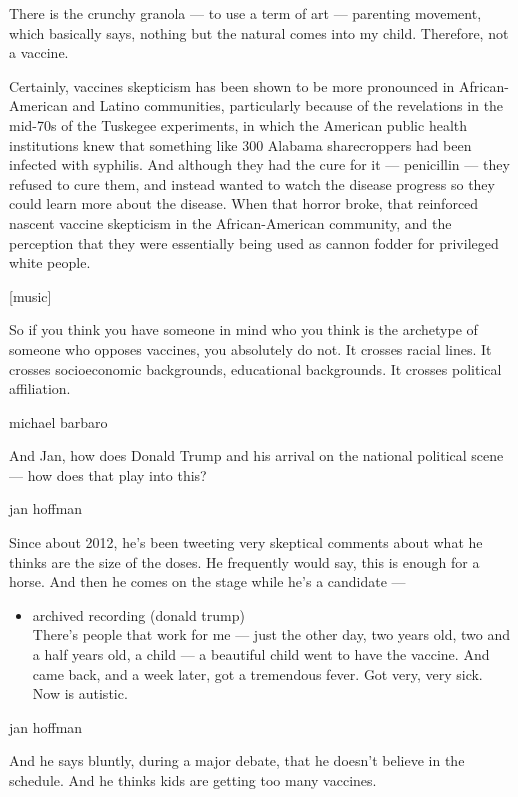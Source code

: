 There is the crunchy granola --- to use a term of art --- parenting
movement, which basically says, nothing but the natural comes into my
child. Therefore, not a vaccine.

Certainly, vaccines skepticism has been shown to be more pronounced in
African-American and Latino communities, particularly because of the
revelations in the mid-70s of the Tuskegee experiments, in which the
American public health institutions knew that something like 300 Alabama
sharecroppers had been infected with syphilis. And although they had the
cure for it --- penicillin --- they refused to cure them, and instead
wanted to watch the disease progress so they could learn more about the
disease. When that horror broke, that reinforced nascent vaccine
skepticism in the African-American community, and the perception that
they were essentially being used as cannon fodder for privileged white
people.

{[}music{]}

So if you think you have someone in mind who you think is the archetype
of someone who opposes vaccines, you absolutely do not. It crosses
racial lines. It crosses socioeconomic backgrounds, educational
backgrounds. It crosses political affiliation.

michael barbaro

And Jan, how does Donald Trump and his arrival on the national political
scene --- how does that play into this?

jan hoffman

Since about 2012, he's been tweeting very skeptical comments about what
he thinks are the size of the doses. He frequently would say, this is
enough for a horse. And then he comes on the stage while he's a
candidate ---

\begin{itemize}
\tightlist
\item
  archived recording (donald trump)\\
  There's people that work for me --- just the other day, two years old,
  two and a half years old, a child --- a beautiful child went to have
  the vaccine. And came back, and a week later, got a tremendous fever.
  Got very, very sick. Now is autistic.
\end{itemize}

jan hoffman

And he says bluntly, during a major debate, that he doesn't believe in
the schedule. And he thinks kids are getting too many vaccines.

